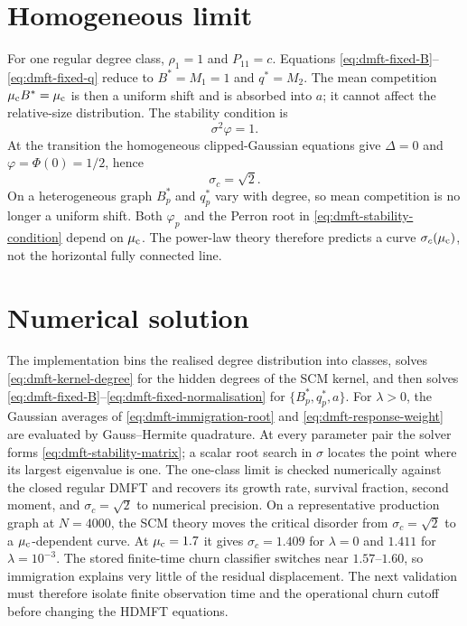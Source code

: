 \section{Homogeneous limit}
\label{sec:dmft-homogeneous-limit}

For one regular degree class, $\rho_1=1$ and $P_{11}=c$.  Equations
\eqref{eq:dmft-fixed-B}--\eqref{eq:dmft-fixed-q} reduce to $B^*=M_1=1$ and
$q^*=M_2$.  The mean competition $\mu_{\rm c}B^*=\mu_{\rm c}$ is then a uniform shift and is
absorbed into $a$; it cannot affect the relative-size distribution.  The stability condition is
\begin{equation}
    \sigma^2\varphi=1.
\end{equation}
At the transition the homogeneous clipped-Gaussian equations give $\Delta=0$ and
$\varphi=\Phi(0)=1/2$, hence
\begin{equation}
    \sigma_c=\sqrt{2}.
\end{equation}
On a heterogeneous graph $B_p^*$ and $q_p^*$ vary with degree, so mean competition is no longer
a uniform shift.  Both $\varphi_p$ and the Perron root in
\eqref{eq:dmft-stability-condition} depend on $\mu_{\rm c}$.  The power-law theory therefore
predicts a curve $\sigma_c(\mu_{\rm c})$, not the horizontal fully connected line.

\section{Numerical solution}
\label{sec:dmft-numerical-solution}

The implementation bins the realised degree distribution into classes, solves
\eqref{eq:dmft-kernel-degree} for the hidden degrees of the SCM kernel, and then solves
\eqref{eq:dmft-fixed-B}--\eqref{eq:dmft-fixed-normalisation} for
$\{B_p^*,q_p^*,a\}$.  For $\lambda>0$, the Gaussian averages of
\eqref{eq:dmft-immigration-root} and \eqref{eq:dmft-response-weight} are evaluated by
Gauss--Hermite quadrature.  At every parameter pair the solver forms
\eqref{eq:dmft-stability-matrix}; a scalar root search in $\sigma$ locates the point where its
largest eigenvalue is one.  The one-class limit is checked numerically against the closed regular
DMFT and recovers its growth rate, survival fraction, second moment, and
$\sigma_c=\sqrt{2}$ to numerical precision.  On a representative production graph at
$N=4000$, the SCM theory moves the critical disorder from $\sigma_c=\sqrt2$ to a
$\mu_{\rm c}$-dependent curve.  At $\mu_{\rm c}=1.7$ it gives $\sigma_c=1.409$ for
$\lambda=0$ and $1.411$ for $\lambda=10^{-3}$.  The stored finite-time churn classifier switches
near $1.57$--$1.60$, so immigration explains very little of the residual displacement.  The next
validation must therefore isolate finite observation time and the operational churn cutoff before
changing the HDMFT equations.
